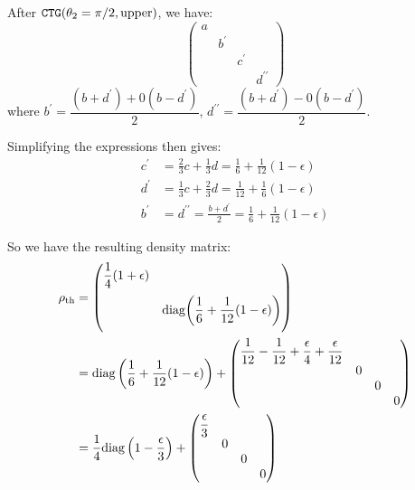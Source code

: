 \begin{parts}
	After $\mathtt{CTG}(\theta_2 = \pi/2, \textnormal{upper})$, we have:
	\begin{equation*}
		\begin{pmatrix}
			a & & & \\
			& b^\prime & & \\
			& & c^\prime & \\
			& & & d^{\prime\prime}
		\end{pmatrix}
	\end{equation*}
	where $b^\prime = \dfrac{(b+d^\prime) + 0 (b-d^\prime)}{2}$, $d^{\prime\prime} = \dfrac{(b+d^\prime) - 0 (b-d^\prime)}{2}$.
	
	Simplifying the expressions then gives:
	\begin{align*}
		c^\prime &= \frac{2}{3}c + \frac{1}{3}d = \frac{1}{6} + \frac{1}{12}(1-\epsilon) \\
		d^\prime &= \frac{1}{3}c + \frac{2}{3}d = \frac{1}{12} + \frac{1}{6}(1-\epsilon) \\
		b^\prime &= d^{\prime\prime} = \frac{b+d^\prime}{2} = \frac{1}{6} + \frac{1}{12}(1-\epsilon)
	\end{align*}
	
	So we have the resulting density matrix:
	\begin{align*}
		\rho_\textnormal{th} &= \begin{pmatrix}
			\dfrac{1}{4}(1+\epsilon) & & & \\
			& \multicolumn{3}{c}{\multirow{3}{*}{diag$\rbracket{\dfrac{1}{6} + \dfrac{1}{12}(1-\epsilon)}$}} \\
			& \multicolumn{3}{c}{} \\
			& \multicolumn{3}{c}{}
		\end{pmatrix} \\
		&= \textnormal{diag}\rbracket{\frac{1}{6} + \frac{1}{12}(1-\epsilon)} + \begin{pmatrix}
			\dfrac{1}{12} - \dfrac{1}{12} + \dfrac{\epsilon}{4} + \dfrac{\epsilon}{12} & & & \\
			& 0 & & \\
			& & 0 & \\
			& & & 0
		\end{pmatrix} \\
		&= \frac{1}{4} \textnormal{diag}\rbracket{1-\frac{\epsilon}{3}} + \begin{pmatrix}
			\dfrac{\epsilon}{3} & & & \\
			& 0 & & \\
			& & 0 & \\
			& & & 0
		\end{pmatrix}
	\end{align*}
	

\end{parts}
